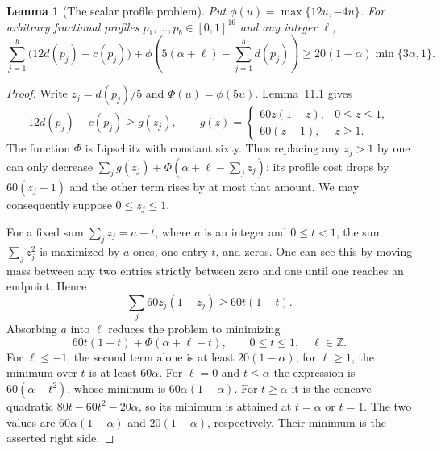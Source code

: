 \documentclass[11pt]{amsart}
\newtheorem{lemma}[theorem]{Lemma}
\theoremstyle{definition}
\theoremstyle{remark}
\begin{document}
\begin{lemma}[The scalar profile problem]\label{lem:scalar-profile}
Put $\phi(u)=\max\{12u,-4u\}$. For arbitrary fractional profiles
$p_1,\ldots,p_b\in[0,1]^{16}$ and any integer $\ell$,
\begin{equation}\tag{58}\label{eq:scalar-profile}
 \sum_{j=1}^b\bigl(12d(p_j)-c(p_j)\bigr)
 +\phi\left(5(\alpha+\ell)-\sum_{j=1}^bd(p_j)\right)
 \geq20(1-\alpha)\min\{3\alpha,1\}.
\end{equation}
\end{lemma}
\begin{proof}
Write $z_j=d(p_j)/5$ and $\Phi(u)=\phi(5u)$. Lemma~11.1 gives
\[
 12d(p_j)-c(p_j)\geq g(z_j),\qquad
 g(z)=\begin{cases}
       60z(1-z),&0\leq z\leq1,\\
       60(z-1),&z\geq1.
      \end{cases}
\]
The function $\Phi$ is Lipschitz with constant sixty. Thus replacing any
$z_j>1$ by one can only decrease
$\sum_jg(z_j)+\Phi(\alpha+\ell-\sum_jz_j)$: its profile cost drops by
$60(z_j-1)$ and the other term rises by at most that amount. We may
consequently suppose $0\leq z_j\leq1$.

For a fixed sum $\sum_jz_j=a+t$, where $a$ is an integer and $0\leq t<1$,
the sum $\sum_jz_j^2$ is maximized by $a$ ones, one entry $t$, and zeros.
One can see this by moving mass between any two entries strictly between
zero and one until one reaches an endpoint. Hence
\[
 \sum_j60z_j(1-z_j)\geq60t(1-t).
\]
Absorbing $a$ into $\ell$ reduces the problem to minimizing
\[
 60t(1-t)+\Phi(\alpha+\ell-t),\qquad 0\leq t\leq1,\quad\ell\in\mathbb Z.
\]
For $\ell\leq-1$, the second term alone is at least $20(1-\alpha)$; for
$\ell\geq1$, the minimum over $t$ is at least $60\alpha$. For $\ell=0$
and $t\leq\alpha$ the expression is $60(\alpha-t^2)$, whose minimum is
$60\alpha(1-\alpha)$. For $t\geq\alpha$ it is the concave quadratic
$80t-60t^2-20\alpha$, so its minimum is attained at $t=\alpha$ or $t=1$.
The two values are $60\alpha(1-\alpha)$ and $20(1-\alpha)$, respectively.
Their minimum is the asserted right side.
\end{proof}
\end{document}

